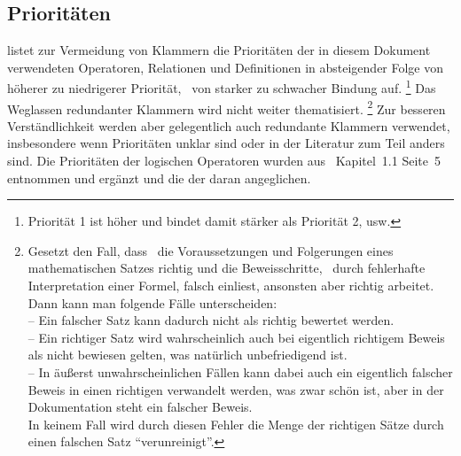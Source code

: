 \subsection{Prioritäten}%
\label{sub:Prioritäten}

 listet zur Vermeidung von Klammern die Prioritäten der in diesem Dokument verwendeten Operatoren, Relationen und Definitionen in absteigender Folge von höherer zu niedrigerer Priorität, \textdh\ von starker zu schwacher Bindung auf.%
\footnote{Priorität 1 ist höher und bindet damit stärker als Priorität 2, usw.}
Das Weglassen redundanter Klammern wird  nicht weiter thematisiert.%
\footnote{%
	Gesetzt den Fall, dass \ASBA\ die Voraussetzungen und Folgerungen eines mathematischen Satzes richtig und die Beweisschritte, \textzB\ durch fehlerhafte Interpretation einer Formel, falsch einliest, ansonsten aber richtig arbeitet.
	Dann kann man folgende Fälle unterscheiden:\\
	-- Ein falscher Satz kann dadurch nicht als richtig bewertet werden.\\
	-- Ein richtiger Satz wird wahrscheinlich auch bei eigentlich richtigem Beweis als nicht bewiesen gelten, was natürlich unbefriedigend ist.\\
	-- In äußerst unwahrscheinlichen Fällen kann dabei auch ein eigentlich falscher Beweis in einen richtigen verwandelt werden, was zwar schön ist, aber in der Dokumentation steht ein falscher Beweis.\\
	In keinem Fall wird durch diesen Fehler die Menge der richtigen Sätze durch einen falschen Satz \enquote{verunreinigt}.
}
Zur besseren Verständlichkeit werden aber gelegentlich auch redundante Klammern verwendet, insbesondere wenn Prioritäten unklar sind oder in der Literatur zum Teil anders sind.
Die Prioritäten der logischen Operatoren wurden aus~\cite{bib:Rautenberg} Kapitel~1.1 Seite~5 entnommen und ergänzt und die der  daran angeglichen.

